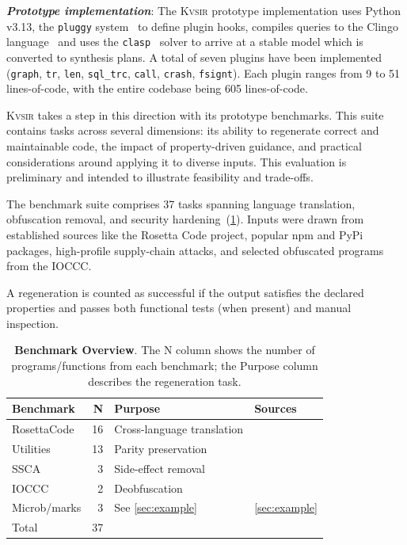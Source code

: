 \documentclass[sigplan,review,anonymous,10pt]{acmart}
\newcommand{\sys}{{\scshape Kv{\textalpha}sir}\xspace}
\newcommand{\heading}[1]{\vspace{2pt}\noindent\textbf{\emph{#1}}:\enspace}
\newcommand{\ttt}[1]{\texttt{#1}\xspace}
\begin{document}
\heading{Prototype implementation}
The \sys prototype implementation uses Python v3.13,
the \ttt{pluggy} system~\cite{pluggy} to define plugin hooks,
compiles queries to the Clingo language~\cite{DBLP:journals/corr/GebserKKS14} and uses the \ttt{clasp}~\cite{gebser2007clasp}
solver to arrive at a stable model which is converted to synthesis plans. 
A total of seven plugins have been implemented (\ttt{graph}, \ttt{tr}, \ttt{len}, \ttt{sql\_trc}, \ttt{call}, \ttt{crash}, \ttt{fsignt}).
Each plugin ranges from 9 to 51 lines-of-code,
with the entire codebase being 605 lines-of-code.

\sys takes a step in this direction with its prototype benchmarks.
This suite contains tasks across several dimensions: its
ability to regenerate correct and maintainable
code, the impact of property-driven guidance,
and practical considerations around applying it
to diverse inputs. This evaluation is
preliminary and intended to illustrate
feasibility and trade-offs.

The benchmark suite comprises 37 tasks spanning language translation, obfuscation
removal, and security hardening~(\cref{tab:benchmarks}).
Inputs were drawn from established sources
like the Rosetta Code project, popular npm and PyPi packages, high-profile supply-chain attacks,
and selected obfuscated programs from the IOCCC.

A regeneration is counted as successful if the output satisfies the declared
properties and passes both functional tests (when present) and manual inspection.

\begin{table}[t]
\centering
\caption{\textbf{Benchmark Overview}. 
The N column shows the number of programs/functions from each benchmark;
the Purpose column describes the regeneration task.}
\begin{tabular}{lrll}
\toprule
Benchmark   & N  & Purpose                    & Sources \\
\midrule
RosettaCode & 16 & Cross-language translation & \cite{rosettacode} \\
Utilities   & 13 & Parity preservation        & \cite{regbench2025} \\
SSCA        & 3  & Side-effect removal & \cite{ohm2020backstabber,ev:eurosec:2022} \\
IOCCC       & 2  & Deobfuscation              & \cite{ioccc} \\
Microb/marks & 3 & See \cref{sec:example} & \cref{sec:example} \\
\midrule
  Total     & 37 &                           & \\
\bottomrule
\end{tabular}
\label{tab:benchmarks}
\end{table}
\end{document}
